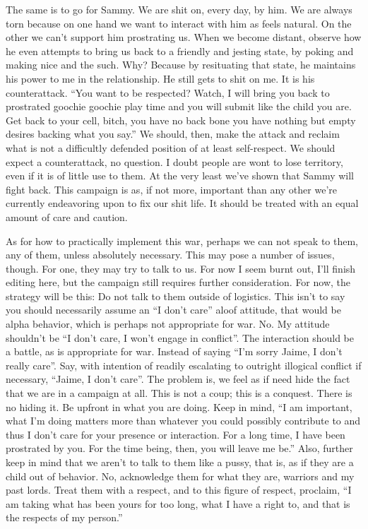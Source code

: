 The same is to go for Sammy. We are shit on, every day, by him. We are
always torn because on one hand we want to interact with him as feels
natural. On the other we can't support him prostrating us. When we
become distant, observe how he even attempts to bring us back to a
friendly and jesting state, by poking and making nice and the such. Why?
Because by resituating that state, he maintains his power to me in the
relationship. He still gets to shit on me. It is his counterattack.
``You want to be respected? Watch, I will bring you back to prostrated
goochie goochie play time and you will submit like the child you are.
Get back to your cell, bitch, you have no back bone you have nothing but
empty desires backing what you say.'' We should, then, make the attack
and reclaim what is not a difficultly defended position of at least
self-respect. We should expect a counterattack, no question. I doubt
people are wont to lose territory, even if it is of little use to them.
At the very least we've shown that Sammy will fight back. This campaign
is as, if not more, important than any other we're currently endeavoring
upon to fix our shit life. It should be treated with an equal amount of
care and caution.

\qquad As for how to practically implement this war, perhaps we can not
speak to them, any of them, unless absolutely necessary. This may pose a
number of issues, though. For one, they may try to talk to us. For now I
seem burnt out, I'll finish editing here, but the campaign still
requires further consideration. For now, the strategy will be this: Do
not talk to them outside of logistics. This isn't to say you should
necessarily assume an ``I don't care'' aloof attitude, that would be
alpha behavior, which is perhaps not appropriate for war. No. My
attitude shouldn't be ``I don't care, I won't engage in conflict''. The
interaction should be a battle, as is appropriate for war. Instead of
saying ``I'm sorry Jaime, I don't really care''. Say, with intention of
readily escalating to outright illogical conflict if necessary, ``Jaime,
I don't care''. The problem is, we feel as if need hide the fact that we
are in a campaign at all. This is not a coup; this is a conquest. There
is no hiding it. Be upfront in what you are doing. Keep in mind, ``I am
important, what I'm doing matters more than whatever you could possibly
contribute to and thus I don't care for your presence or interaction.
For a long time, I have been prostrated by you. For the time being,
then, you will leave me be.'' Also, further keep in mind that we aren't
to talk to them like a pussy, that is, as if they are a child out of
behavior. No, acknowledge them for what they are, warriors and my past
lords. Treat them with a respect, and to this figure of respect,
proclaim, ``I am taking what has been yours for too long, what I have a
right to, and that is the respects of my person.''


